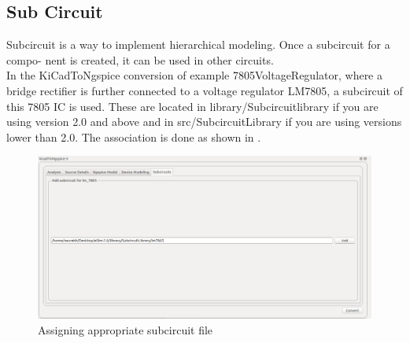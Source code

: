\subsection{Sub Circuit}
Subcircuit is a way to implement hierarchical modeling.  Once a subcircuit for a compo-
nent is created, it can be used in other circuits. \\
In the KiCadToNgspice conversion of example 7805VoltageRegulator, where a bridge rectifier is further connected to a voltage regulator LM7805, a subcircuit of this 7805 IC is used. These are located in library/Subcircuitlibrary if you are using version 2.0 and above and in src/SubcircuitLibrary if you are using versions lower than 2.0. The association is done as shown in .
\begin{figure}
\centering
\includegraphics[width=\lgfig]{7805.png}
\caption{Assigning appropriate subcircuit file }
\label{7805}
\end{figure}
\\

